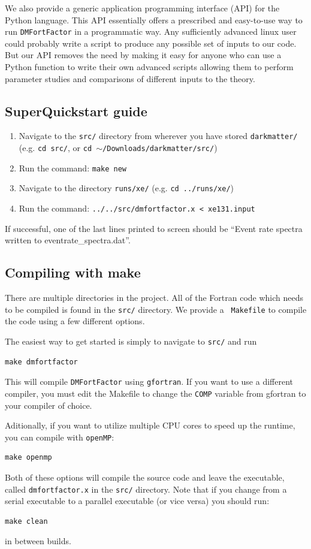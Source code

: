\documentclass[
14pt, %
a4paper, %
oneside, %
headinclude,footinclude, %
BCOR5mm, %
]{scrartcl}
\begin{document}
We also provide a generic application programming interface (API) for the Python
language.  This API essentially offers a prescribed and easy-to-use way to run
{\tt DMFortFactor} in a programmatic way.  Any sufficiently advanced linux user
could probably write a script to produce any possible set of inputs to our code.
But our API removes the need by making it easy for anyone who can use a Python
function to write their own advanced scripts allowing them to perform parameter
studies and comparisons of different inputs to the theory.

\subsection{SuperQuickstart guide}
\begin{enumerate}
	\item Navigate to the {\tt src/} directory from wherever you have stored {\tt darkmatter/} (e.g. {\tt cd src/}, or {\tt cd $\sim$/Downloads/darkmatter/src/})
	\item Run the command: {\tt make new}
	\item Navigate to the directory {\tt runs/xe/} (e.g. {\tt cd ../runs/xe/})
	\item Run the command: {\tt ../../src/dmfortfactor.x < xe131.input}
\end{enumerate}
If successful,  one of the last lines printed to screen should be ``Event rate
spectra written to eventrate_spectra.dat''.

\subsection{Compiling with make}
There are multiple directories in the project. All of the Fortran code which
needs to be compiled is found in the {\tt src/} directory.  We provide a {\tt
Makefile} to compile the code using a few different options. 

The easiest way to get started is simply to navigate to {\tt src/}  and run
\begin{lstlisting}
make dmfortfactor
\end{lstlisting}
This will compile {\tt DMFortFactor} using {\tt gfortran}.  If you want to use a
different compiler, you must edit the Makefile to change the {\tt COMP} variable
from gfortran to your compiler of choice.

Aditionally, if you want to utilize multiple CPU cores to speed up the runtime,
you can compile with {\tt openMP}: 
\begin{lstlisting}
make openmp
\end{lstlisting}
Both of these options will compile the source code and leave the executable,
called {\tt dmfortfactor.x} in the {\tt src/} directory.  Note that if you
change from a serial executable to a parallel executable (or vice versa) you
should run:
\begin{lstlisting}
make clean
\end{lstlisting}
in between builds.
\end{document}
